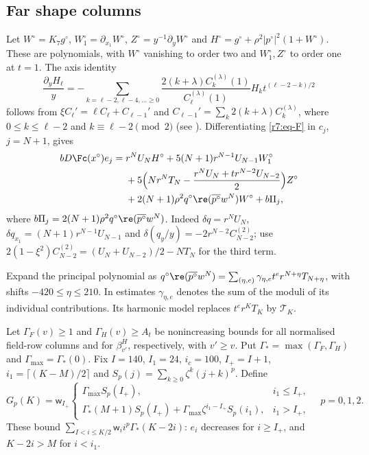 \subsection{Far shape columns}\label{r7:sec-far}
Let $W^\circ=K_7g^\circ$, $W_1^\circ=\partial_{x_1}W^\circ$, $Z^\circ=y^{-1}\partial_yW^\circ$ and $H^\circ=g^\circ+\rho^2|p^\circ|^2(1+W^\circ)$. These are polynomials, with $W^\circ$ vanishing to order two and $W_1^\circ,Z^\circ$ to order one at $t=1$. The axis identity
\[
\frac{\partial_yH_\ell}y=-\sum_{k=\ell-2,\ell-4,\ldots\geq0}
\frac{2(k+\lambda)C_k^{(\lambda)}(1)}{C_\ell^{(\lambda)}(1)}H_kt^{(\ell-2-k)/2}
\]
follows from $\xi C_\ell'=\ell C_\ell+C_{\ell-1}'$ and $C_{\ell-1}'=\sum_k2(k+\lambda)C_k^{(\lambda)}$, where $0\leq k\leq\ell-2$ and $k\equiv\ell-2\pmod2$ (see \cite[18.9]{DLMF}). Differentiating \eqref{r7:eq-F} in $c_j$, $j=N+1$, gives
\begin{equation}\label{r7:eq-farcol}
\begin{split}
bD\Fc(x^\circ)e_j={}&r^NU_NH^\circ+5(N+1)r^{N-1}U_{N-1}W_1^\circ\\
&+5\Big(Nr^NT_N-\frac{r^NU_N+tr^{N-2}U_{N-2}}2\Big)Z^\circ\\
&+2(N+1)\rho^2q^\circ\re(\overline{p^\circ}w^N)W^\circ+b\Pi_j,
\end{split}
\end{equation}
where $b\Pi_j=2(N+1)\rho^2q^\circ\re(\overline{p^\circ}w^N)$. Indeed $\delta q=r^NU_N$, $\delta q_{x_1}=(N+1)r^{N-1}U_{N-1}$ and $\delta(q_y/y)=-2r^{N-2}C^{(2)}_{N-2}$; use $2(1-\xi^2)C^{(2)}_{N-2}=(U_N+U_{N-2})/2-NT_N$ for the third term.

Expand the principal polynomial as $q^\circ\re(\overline{p^\circ}w^N)=\sum_{(\eta,e)}\gamma_{\eta,e}t^er^{N+\eta}T_{N+\eta}$, with shifts $-420\leq\eta\leq210$. In estimates $\gamma_{\eta,e}$ denotes the sum of the moduli of its individual contributions. Its harmonic model replaces $t^er^KT_K$ by $\mathcal T_K$.

Let $\Gamma_F(v)\geq1$ and $\Gamma_H(v)\geq A_t$ be nonincreasing bounds for all normalised field-row columns and for $\beta^H_{v'}$, respectively, with $v'\geq v$. Put $\Gamma_* =\max(\Gamma_F,\Gamma_H)$ and $\Gamma_{\max}=\Gamma_*(0)$. Fix $I=140$, $I_1=24$, $i_c=100$, $I_+=I+1$, $i_1=\lceil(K-M)/2\rceil$ and $S_p(j)=\sum_{k\geq0}\zeta^k(j+k)^p$. Define
\[
G_p(K)=\mathsf w_{I_+}\begin{cases}
\Gamma_{\max}S_p(I_+),&i_1\leq I_+,\\
\Gamma_*(M+1)S_p(I_+)+\Gamma_{\max}\zeta^{i_1-I_+}S_p(i_1),&i_1>I_+,
\end{cases}\quad p=0,1,2.
\]
These bound $\sum_{I<i\leq K/2}\mathsf w_ii^p\Gamma_*(K-2i)$: $e_i$ decreases for $i\geq I_+$, and $K-2i>M$ for $i<i_1$.

